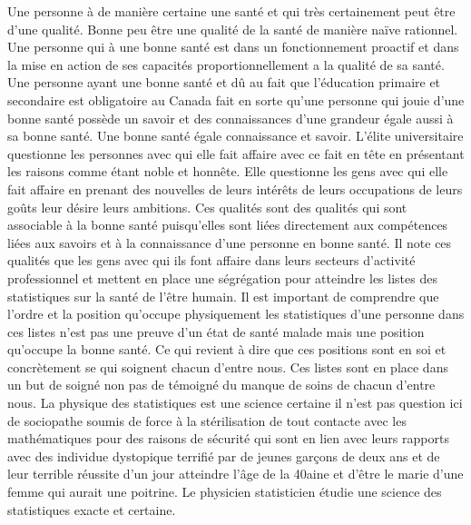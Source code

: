 \documentclass[12pt,letterpaper,oneside]{article}
\begin{document}
Une personne à de manière certaine une santé et qui très certainement peut être d’une qualité. Bonne peu être une qualité de la santé de manière naïve rationnel. Une personne qui à une bonne santé est dans un fonctionnement proactif et dans la mise en action de ses capacités proportionnellement a la qualité de sa santé. Une personne ayant une bonne santé et dû au fait que l’éducation primaire et secondaire est obligatoire au Canada fait en sorte qu’une personne qui jouie d’une bonne santé possède un savoir et des connaissances d’une grandeur égale aussi à sa bonne santé. Une bonne santé égale connaissance et savoir. L’élite universitaire questionne les personnes avec qui elle fait affaire avec ce fait en tête en présentant les raisons comme étant noble et honnête. Elle questionne les gens avec qui elle fait affaire en prenant des nouvelles de leurs intérêts de leurs occupations de leurs goûts leur désire leurs ambitions. Ces qualités sont des qualités qui sont associable à la bonne santé puisqu’elles sont liées directement aux compétences liées aux savoirs et à la connaissance d’une personne en bonne santé.
Il note ces qualités que les gens avec qui ils font affaire dans leurs secteurs d’activité professionnel et mettent en place une ségrégation pour atteindre les listes des statistiques sur la santé de l’être humain. Il est important de comprendre que l’ordre et la position qu’occupe physiquement les statistiques d’une personne dans ces listes n’est pas une preuve d’un état de santé malade mais une position qu’occupe la bonne santé. Ce qui revient à dire que ces positions sont en soi et concrètement se qui soignent chacun d’entre nous. Ces listes sont en place dans un but de soigné non pas de témoigné du manque de soins de chacun d’entre nous. La physique des statistiques est une science certaine il n’est pas question ici de sociopathe soumis de force à la stérilisation de tout contacte avec les mathématiques pour des raisons de sécurité qui sont en lien avec leurs rapports avec des individue dystopique terrifié par de jeunes garçons de deux ans et de leur terrible réussite d’un jour atteindre l’âge de la 40aine et d’être le marie d’une femme qui aurait une poitrine. Le physicien statisticien étudie une science des statistiques exacte et certaine.
\end{document}
